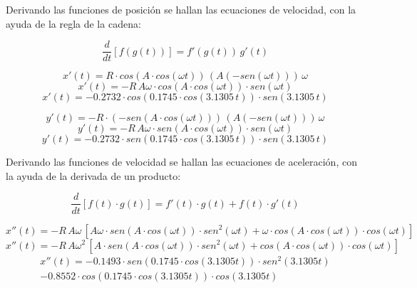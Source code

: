 \documentclass[letter,11pt]{article}
\begin{document}
Derivando las funciones de posición se hallan las ecuaciones de velocidad, con
la ayuda de la regla de la cadena:

\begin{equation*}
    \frac{d}{dt} \left[f(g(t))\right] = f'(g(t))\, g'(t)
\end{equation*}

\begin{equation*}
    x'(t) = R \cdot cos(A \cdot cos(\omega t))\, (A (-sen(\omega t)))\, \omega
\end{equation*}
\begin{equation*}
    x'(t) = -R\, A \omega \cdot cos(A \cdot cos(\omega t)) \cdot sen(\omega t)
\end{equation*}
\begin{equation}
    x'(t) = -0.2732 \cdot cos(0.1745 \cdot cos(3.1305\, t)) \cdot sen(3.1305\, t)
\end{equation}

\begin{equation*}
    y'(t) = -R \cdot (-sen(A \cdot cos(\omega t)))\, (A (-sen(\omega t)))\, \omega
\end{equation*}
\begin{equation*}
    y'(t) = -R\, A \omega \cdot sen(A \cdot cos(\omega t)) \cdot sen(\omega t)
\end{equation*}
\begin{equation}
    y'(t) = -0.2732 \cdot sen(0.1745 \cdot cos(3.1305\, t)) \cdot sen(3.1305\, t)
\end{equation}

Derivando las funciones de velocidad se hallan las ecuaciones de aceleración,
con la ayuda de la derivada de un producto:

\begin{equation*}
    \frac{d}{dt} \left[f(t) \cdot g(t)\right] = f'(t) \cdot g(t) + f(t) \cdot g'(t)
\end{equation*}

\begin{equation*}
    x''(t) = -R\, A \omega\, [ A \omega \cdot sen(A \cdot cos(\omega t)) \cdot sen^2(\omega t) + \omega \cdot cos(A \cdot cos(\omega t)) \cdot cos(\omega t)]
\end{equation*}
\begin{equation*}
    x''(t) = -R\, A \omega^2\, [ A \cdot sen(A \cdot cos(\omega t)) \cdot sen^2(\omega t) + cos(A \cdot cos(\omega t)) \cdot cos(\omega t)]
\end{equation*}
\begin{equation}
    \begin{split}
        x''(t) = -0.1493 \cdot sen(0.1745 \cdot cos(3.1305 t)) \cdot sen^2(3.1305 t) \\
                 -0.8552 \cdot cos(0.1745 \cdot cos(3.1305t)) \cdot cos(3.1305t)
    \end{split}
\end{equation}
\end{document}
